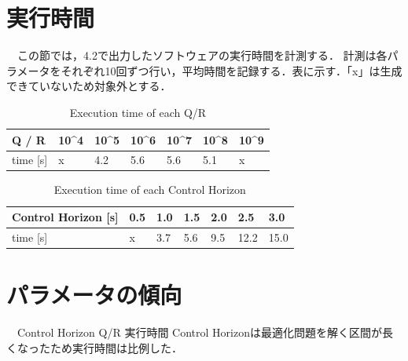 \section{実行時間}
　この節では，4.2で出力したソフトウェアの実行時間を計測する．
計測は各パラメータをそれぞれ10回ずつ行い，平均時間を記録する．表に示す．「x」は生成できていないため対象外とする．
\begin{table}[hbtp]
  \centering
  \caption{Execution time of each Q/R}
  \label{Execution time of each Q/R}
  \begin{tabular}{|l|l|l|l|l|l|l|}
  \hline \hline
  Q / R        & 10\textasciicircum{}4 & 10\textasciicircum{}5 & 10\textasciicircum{}6 & 10\textasciicircum{}7 & 10\textasciicircum{}8 & 10\textasciicircum{}9 \\ \hline
  time {[}s{]} & x                     & 4.2                   & 5.6                   & 5.6                   & 5.1                   & x                     \\ \hline
  \end{tabular}
\end{table}

\begin{table}[hbtp]
  \centering
  \caption{Execution time of each Control Horizon}
  \label{Execution time of each Control}
  \begin{tabular}{|l|l|l|l|l|l|l|}
  \hline \hline
  Control Horizon {[}s{]} & 0.5 & 1.0 & 1.5 & 2.0 & 2.5  & 3.0  \\ \hline
  time {[}s{]}            & x   & 3.7 & 5.6 & 9.5 & 12.2 & 15.0 \\ \hline
  \end{tabular}
\end{table}

\section{パラメータの傾向}

　Control Horizon
Q/R
実行時間
Control Horizonは最適化問題を解く区間が長くなったため実行時間は比例した．
\newpage